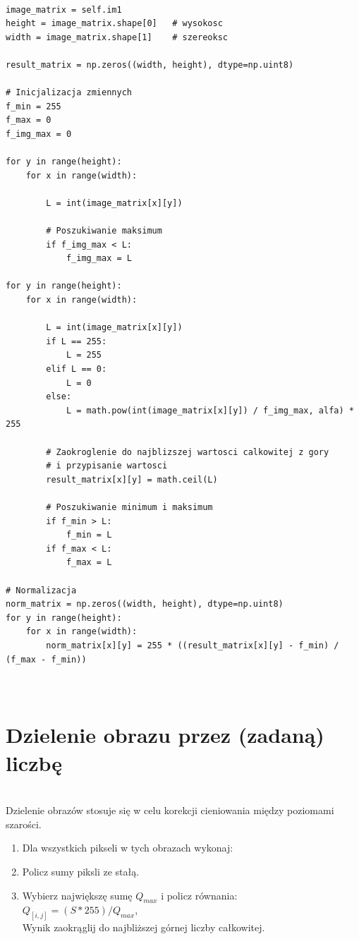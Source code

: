 \documentclass[final,a4paper,openany,12pt]{mwbk}
\begin{document}
\begin{lstlisting}[caption=Potęgowanie obrazu szarego (z zadaną potęgą)]

image_matrix = self.im1
height = image_matrix.shape[0]   # wysokosc
width = image_matrix.shape[1]    # szereoksc

result_matrix = np.zeros((width, height), dtype=np.uint8)

# Inicjalizacja zmiennych
f_min = 255
f_max = 0
f_img_max = 0

for y in range(height):
    for x in range(width):  
        
        L = int(image_matrix[x][y])

        # Poszukiwanie maksimum
        if f_img_max < L:
            f_img_max = L

for y in range(height):
    for x in range(width):  
        
        L = int(image_matrix[x][y])
        if L == 255:
            L = 255
        elif L == 0:
            L = 0
        else:
            L = math.pow(int(image_matrix[x][y]) / f_img_max, alfa) * 255

        # Zaokroglenie do najblizszej wartosci calkowitej z gory
        # i przypisanie wartosci
        result_matrix[x][y] = math.ceil(L)

        # Poszukiwanie minimum i maksimum
        if f_min > L:
            f_min = L
        if f_max < L:
            f_max = L

# Normalizacja
norm_matrix = np.zeros((width, height), dtype=np.uint8)
for y in range(height):
    for x in range(width):
        norm_matrix[x][y] = 255 * ((result_matrix[x][y] - f_min) / (f_max - f_min))



\end{lstlisting}

\section {Dzielenie obrazu przez (zadaną) liczbę }
\hfill\\
\indent
Dzielenie obrazów stosuje się w celu korekcji cieniowania między poziomami szarości.

\begin{enumerate}	
		
		\item Dla wszystkich pikseli w tych obrazach wykonaj:
		\item Policz sumy piksli ze stałą.
		\item Wybierz największę sumę $Q_{max}$ i policz równania:\\
		$Q_[i,j] = ({S} * 255)/Q_{max}$,\\
		Wynik zaokrąglij do najbliższej górnej liczby całkowitej.
	\end{enumerate}
	
\end{document}
